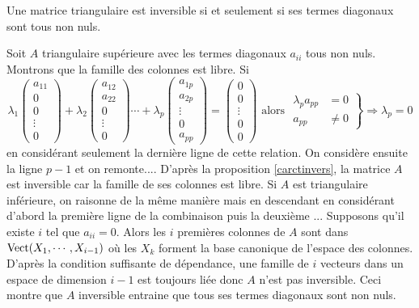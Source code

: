 \begin{propn}
  Une matrice triangulaire est inversible si et seulement si ses termes diagonaux sont tous non nuls.
\end{propn}
\begin{demo}
Soit $A$ triangulaire supérieure avec les termes diagonaux $a_{i i}$ tous non nuls. Montrons que la famille des colonnes est libre. Si
\[
\lambda_1 
 \begin{pmatrix}
  a_{1 1} \\ 0 \\ 0 \\ \vdots \\ 0
 \end{pmatrix}
+ \lambda_2 
\begin{pmatrix}
  a_{1 2} \\ a_{2 2} \\ 0 \\ \vdots \\ 0
 \end{pmatrix}
 \cdots 
+ \lambda_p 
\begin{pmatrix}
  a_{1 p} \\ a_{2 p} \\ \vdots \\ 0 \\ a_{p p}
 \end{pmatrix} 
 =
\begin{pmatrix}
  0 \\ 0 \\ \vdots \\ 0 \\ 0
 \end{pmatrix} 
\text{ alors }
\left.
\begin{aligned}
  \lambda_p a_{p p} &= 0 \\ a_{p p} &\neq 0
\end{aligned}
\right\rbrace \Rightarrow \lambda_p = 0
\]
en considérant seulement la dernière ligne de cette relation. On considère ensuite la ligne $p-1$ et on remonte....\newline
D'après la proposition \ref{carctinvers}, la matrice $A$ est inversible car la famille de ses colonnes est libre.\newline
Si $A$ est triangulaire inférieure, on raisonne de la même manière mais en descendant en considérant d'abord la première ligne de la combinaison puis la deuxième ...\newline
Supposons qu'il existe $i$ tel que $a_{i i} = 0$. Alors les $i$ premières colonnes de $A$ sont dans $\mathop{\mathrm{Vect}}(X_1,\cdots, X_{i-1})$ où les $X_k$ forment la base canonique de l'espace des colonnes. D'après la condition suffisante de dépendance, une famille de $i$ vecteurs dans un espace de dimension $i-1$ est toujours liée donc $A$ n'est pas inversible. Ceci montre que $A$ inversible entraine que tous ses termes diagonaux sont non nuls.
\end{demo}

